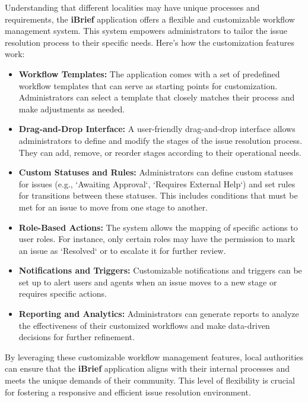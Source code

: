 Understanding that different localities may have unique processes and requirements, the \textbf{iBrief} application offers a flexible and customizable \gls{workflow} management system. This system empowers administrators to tailor the issue resolution process to their specific needs. Here's how the customization features work:

\begin{itemize}
    \item \textbf{Workflow Templates:} The application comes with a set of predefined workflow templates that can serve as starting points for customization. Administrators can select a template that closely matches their process and make adjustments as needed.
    
    \item \textbf{Drag-and-Drop Interface:} A user-friendly drag-and-drop interface allows administrators to define and modify the stages of the issue resolution process. They can add, remove, or reorder stages according to their operational needs.
    
    \item \textbf{Custom Statuses and Rules:} Administrators can define custom statuses for issues (e.g., `Awaiting Approval`, `Requires External Help`) and set rules for transitions between these statuses. This includes conditions that must be met for an issue to move from one stage to another.
    
    \item \textbf{Role-Based Actions:} The system allows the mapping of specific actions to user roles. For instance, only certain roles may have the permission to mark an issue as `Resolved` or to escalate it for further review.
    
    \item \textbf{Notifications and Triggers:} Customizable notifications and triggers can be set up to alert users and agents when an issue moves to a new stage or requires specific actions.
    
    \item \textbf{Reporting and Analytics:} Administrators can generate reports to analyze the effectiveness of their customized workflows and make data-driven decisions for further refinement.
\end{itemize}

By leveraging these customizable workflow management features, local authorities can ensure that the \textbf{iBrief} application aligns with their internal processes and meets the unique demands of their community. This level of flexibility is crucial for fostering a responsive and efficient issue resolution environment.
